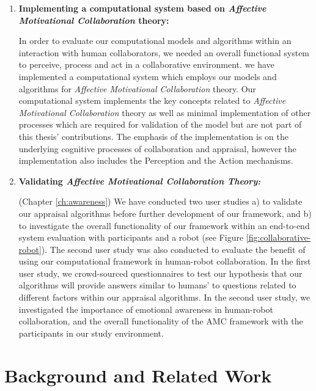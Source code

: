 \documentclass[12pt]{report}
\begin{document}
\begin{enumerate}
  \item \textbf{Implementing a computational system based on \textit{Affective
  Motivational Collaboration} theory:}

  In order to evaluate our computational models and algorithms within an
  interaction with human collaborators, we needed an overall functional system
  to perceive, process and act in a collaborative environment. we have
  implemented a computational system which employs our models and algorithms for
  \textit{Affective Motivational Collaboration} theory. Our computational system
  implements the key concepts related to \textit{Affective Motivational
  Collaboration} theory as well as minimal implementation of other processes
  which are required for validation of the model but are not part of this
  thesis' contributions. The emphasis of the implementation is on the underlying
  cognitive processes of collaboration and appraisal, however the implementation
  also includes the Perception and the Action mechanisms.

  \item \textbf{Validating \textit{Affective Motivational Collaboration
  Theory:}}

  (Chapter \ref{ch:awareness}) We have conducted two user studies a) to validate
  our appraisal algorithms before further development of our framework, and b)
  to investigate the overall functionality of our framework within an end-to-end
  system evaluation with participants and a robot (see Figure
  \ref{fig:collaborative-robot}). The second user study was also conducted to
  evaluate the benefit of using our computational framework in human-robot
  collaboration. In the first user study, we crowd-sourced questionnaires to
  test our hypothesis that our algorithms will provide answers similar to
  humans' to questions related to different factors within our appraisal
  algorithms. In the second user study, we investigated the importance of
  emotional awareness in human-robot collaboration, and the overall
  functionality of the AMC framework with the participants in our study
  environment.
\end{enumerate}

\chapter{Background and Related Work}
\label{ch:background}

\vspace*{-5mm}
\end{document}

